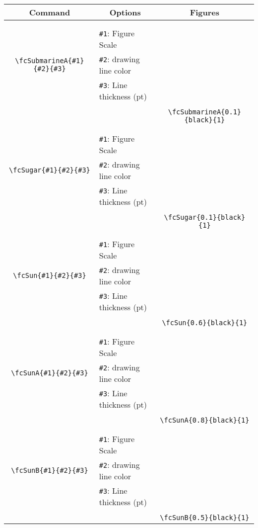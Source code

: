 \documentclass[x11names]{article}
\begin{document}
\begin{table}[H]\centering\begin{tabular}{|c|l|c|}\hline {\bf Command}& \multicolumn{1}{c|}{{\bf Options}} & {\bf Figures}\\  \hline	&&\multirow{5}{*}{\fcSubmarineA{0.1}{black}{1}}\\	&&\\	&\verb|#1|: Figure Scale &\\	\verb|\fcSubmarineA{#1}{#2}{#3}|&	\verb|#2|: drawing line color &\\	&\verb|#3|: Line thickness (pt) &\\ &&\\&&	\verb|\fcSubmarineA{0.1}{black}{1}|\\\hline 	
	&&\multirow{5}{*}{\fcSugar{0.1}{black}{1}}\\	&&\\	&\verb|#1|: Figure Scale &\\	\verb|\fcSugar{#1}{#2}{#3}|&	\verb|#2|: drawing line color &\\	&\verb|#3|: Line thickness (pt) &\\ &&\\&&	\verb|\fcSugar{0.1}{black}{1}|\\\hline 	
	&&\multirow{5}{*}{\fcSun{0.6}{black}{1}}\\	&&\\	&\verb|#1|: Figure Scale &\\	\verb|\fcSun{#1}{#2}{#3}|&	\verb|#2|: drawing line color &\\	&\verb|#3|: Line thickness (pt) &\\ &&\\&&	\verb|\fcSun{0.6}{black}{1}|\\\hline 	
	&&\multirow{5}{*}{\fcSunA{0.8}{black}{1}}\\	&&\\	&\verb|#1|: Figure Scale &\\	\verb|\fcSunA{#1}{#2}{#3}|&	\verb|#2|: drawing line color &\\	&\verb|#3|: Line thickness (pt) &\\ &&\\&&	\verb|\fcSunA{0.8}{black}{1}|\\\hline 	
	&&\multirow{5}{*}{\fcSunB{0.5}{black}{1}}\\	&&\\	&\verb|#1|: Figure Scale &\\	\verb|\fcSunB{#1}{#2}{#3}|&	\verb|#2|: drawing line color &\\	&\verb|#3|: Line thickness (pt) &\\ &&\\&&	\verb|\fcSunB{0.5}{black}{1}|\\\hline 	

\end{tabular}
\end{table}
\end{document}

